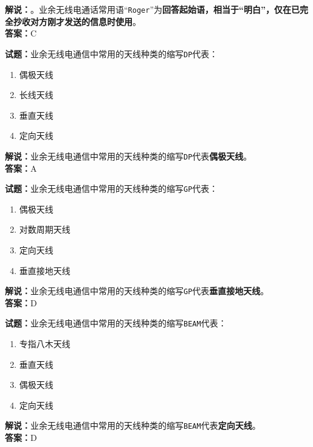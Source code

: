 \documentclass{ctexbook}
\begin{document}
\noindent\textbf{解说：}。业余无线电通话常用语“\texttt{Roger}”为\textbf{回答起始语，相当于“明白”，仅在已完全抄收对方刚才发送的信息时使用}。\\\noindent\textbf{答案：}C


\bigskip


\noindent\textbf{试题：}业余无线电通信中常用的天线种类的缩写\texttt{DP}代表：

\begin{enumerate}[leftmargin=3em]
	\item 偶极天线
	\item 长线天线
	\item 垂直天线
	\item 定向天线
\end{enumerate}

\noindent\textbf{解说：}业余无线电通信中常用的天线种类的缩写\texttt{DP}代表\textbf{偶极天线}。\\\noindent\textbf{答案：}A


\bigskip


\noindent\textbf{试题：}业余无线电通信中常用的天线种类的缩写\texttt{GP}代表：

\begin{enumerate}[leftmargin=3em]
	\item 偶极天线
	\item 对数周期天线
	\item 定向天线
	\item 垂直接地天线
\end{enumerate}

\noindent\textbf{解说：}业余无线电通信中常用的天线种类的缩写\texttt{GP}代表\textbf{垂直接地天线}。\\\noindent\textbf{答案：}D


\bigskip


\noindent\textbf{试题：}业余无线电通信中常用的天线种类的缩写\texttt{BEAM}代表：

\begin{enumerate}[leftmargin=3em]
	\item 专指八木天线
	\item 垂直天线
	\item 偶极天线
	\item 定向天线
\end{enumerate}

\noindent\textbf{解说：}业余无线电通信中常用的天线种类的缩写\texttt{BEAM}代表\textbf{定向天线}。\\\noindent\textbf{答案：}D


\bigskip
\end{document}
